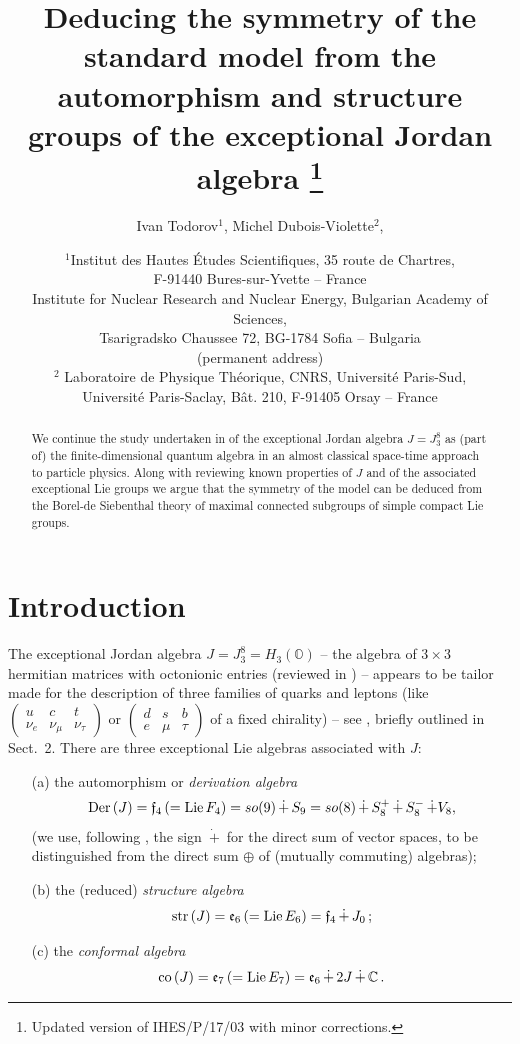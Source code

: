 \documentclass{article}
\title{Deducing the symmetry of the standard model from the automorphism and structure groups of the exceptional Jordan algebra
\footnote{Updated version of IHES/P/17/03 with minor corrections.}}
\author{Ivan Todorov$^1$, Michel Dubois-Violette$^2$,}
\date{
\small 
$^1$Institut des Hautes \'Etudes Scientifiques, 35 route de Chartres, 
\\ F-91440 Bures-sur-Yvette -- France
\\ Institute for Nuclear Research and Nuclear Energy, Bulgarian Academy of Sciences, 
\\ Tsarigradsko Chaussee 72, BG-1784 Sofia -- Bulgaria
\\ (permanent address)\\
$^2$ Laboratoire de Physique Th\'eorique, CNRS, Universit\'e Paris-Sud, 
\\ Universit\'e Paris-Saclay, B\^at. 210, F-91405 Orsay -- France}
\newcommand{\be}{\begin{equation}}
\newcommand{\ee}{\end{equation}}
\begin{document}
\maketitle

\vglue 2cm

\begin{abstract}
We continue the study undertaken in \cite{DV} of the exceptional Jordan algebra $J = J_3^8$ as (part of) the finite-dimensional quantum algebra in  an almost classical space-time approach to particle physics. Along with reviewing known properties of $J$ and of the associated exceptional Lie groups we argue that the symmetry of the model can be deduced from the Borel-de Siebenthal theory of maximal connected subgroups of simple compact Lie groups.
\end{abstract}

\newpage


\section{Introduction}\label{sec1}

The exceptional Jordan algebra $J = J_3^8 = H_3 ({\mathbb O})$ -- the algebra of $3 \times 3$ hermitian matrices with octonionic entries (reviewed in \cite{McC,J68,B,Be,BS,G,Y}) -- appears to be tailor made for the description of three families of quarks and leptons (like $\begin{pmatrix} u &c &t \\ \nu_e &\nu_{\mu} &\nu_{\tau} \end{pmatrix}$ or $\begin{pmatrix} d &s &b \\ e &\mu &\tau \end{pmatrix}$ of a fixed chirality) -- see \cite{DV}, briefly outlined in Sect.~2. There are three exceptional Lie algebras associated with $J$:
\begin{enumerate}
\item[(a)] the automorphism or {\it derivation algebra}
\be
\label{eq11}
{\rm Der} \, (J) = {\mathfrak f}_4 \, (= {\rm Lie} \, F_4) = so (9) \, \dot + \, S_9 = so (8) \, \dot + \, S_8^+ \, \dot + \, S_8^- \, \dot + V_8,
\ee
(we use, following \cite{BS}, the sign $\, \dot + \, $ for the direct sum of vector spaces, to be distinguished from the direct sum $\oplus$ of (mutually commuting) algebras);
\item[(b)] the (reduced) {\it structure algebra}
\be
\label{eq12}
{\rm str} \, (J) = {\mathfrak e}_6 \, (= {\rm Lie} \, E_6) = {\mathfrak f}_4 \, \dot + \,  J_0 \, ;
\ee
\item[(c)] the {\it conformal algebra}
\be
\label{eq13}
{\rm co} \, (J) = {\mathfrak e}_7 \, (= {\rm Lie} \, E_7) = {\mathfrak e}_6 \, \dot + \, 2J \, \dot + \, {\mathbb C} \, .
\ee
\end{enumerate}
\end{document}
